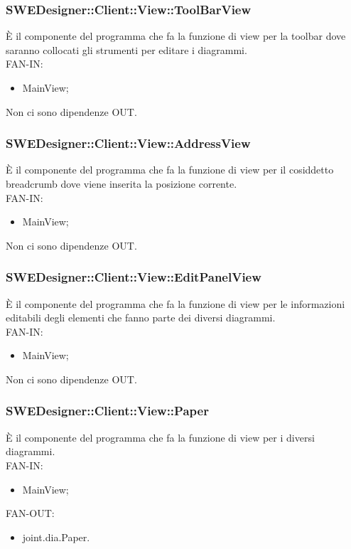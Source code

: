 \documentclass[../PianoDiQualifica.tex]{subfiles}
\begin{document}
		\subsubsection{SWEDesigner::Client::View::ToolBarView}
		È il componente del programma che fa la funzione di view per la toolbar dove saranno collocati gli strumenti per editare i diagrammi.\\
		FAN-IN:
		\begin{itemize}
			\item MainView;
		\end{itemize}
		Non ci sono dipendenze OUT.
		\subsubsection{SWEDesigner::Client::View::AddressView}
		È il componente del programma che fa la funzione di view per il cosiddetto breadcrumb dove viene inserita la posizione corrente.\\
		FAN-IN:
		\begin{itemize}
			\item MainView;
		\end{itemize}
		Non ci sono dipendenze OUT.
		\subsubsection{SWEDesigner::Client::View::EditPanelView}
		È il componente del programma che fa la funzione di view per le informazioni editabili degli elementi che fanno parte dei diversi diagrammi.\\
		FAN-IN:
		\begin{itemize}
			\item MainView;
		\end{itemize}
		Non ci sono dipendenze OUT.
		\subsubsection{SWEDesigner::Client::View::Paper}
		È il componente del programma che fa la funzione di view per i diversi diagrammi.\\
		FAN-IN:
		\begin{itemize}
			\item MainView;
		\end{itemize}
			FAN-OUT:
			\begin{itemize}
				\item joint.dia.Paper.
			\end{itemize}
\end{document}
